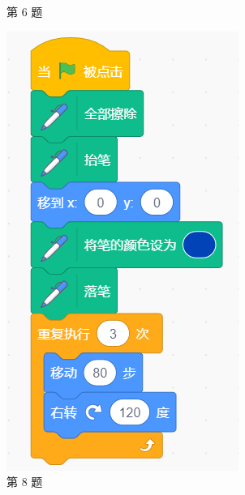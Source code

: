 \documentclass[10pt, a4paper]{article}
\begin{document}
\begin{enumerate}
\begin{figure}[htbp]
\begin{minipage}[t]{.6\textwidth}
\begin{minipage}[t]{.48\textwidth}
                \end{minipage}
                \caption*{第 6 题}
            \end{minipage}
            \begin{minipage}[t]{.15\textwidth}
                \centering
                \includegraphics[width=\textwidth]{8.png}
                \caption*{第 8 题}

\end{minipage}
\end{figure}
\end{enumerate}
\end{document}
